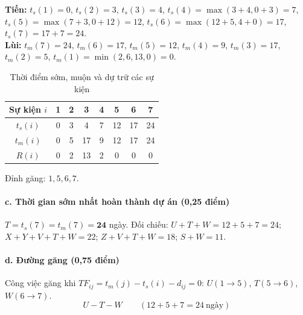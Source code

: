 \documentclass[12pt,a4paper]{article}
\begin{document}
{\small
\textbf{Tiến:}
$t_s(1)=0$,
$t_s(2)=3$,
$t_s(3)=4$,
$t_s(4)=\max(3+4,0+3)=7$,
$t_s(5)=\max(7+3,0+12)=12$,
$t_s(6)=\max(12+5,4+0)=17$,
$t_s(7)=17+7=24$.
\\
\textbf{Lùi:}
$t_m(7)=24$,
$t_m(6)=17$,
$t_m(5)=12$,
$t_m(4)=9$,
$t_m(3)=17$,
$t_m(2)=5$,
$t_m(1)=\min(2,6,13,0)=0$.
}

\begin{table}[H]\centering
\caption{Thời điểm sớm, muộn và dự trữ các sự kiện}
\begin{tabular}{c|ccccccc}
\toprule
Sự kiện $i$ & 1 & 2 & 3 & 4 & 5 & 6 & 7\\
\midrule
$t_s(i)$ & 0 & 3 & 4 & 7 & 12 & 17 & 24\\
$t_m(i)$ & 0 & 5 & 17 & 9 & 12 & 17 & 24\\
$R(i)$   & 0 & 2 & 13 & 2 & 0 & 0 & 0\\
\bottomrule
\end{tabular}
\end{table}

Đỉnh găng: $1,5,6,7$.

\paragraph{c. Thời gian sớm nhất hoàn thành dự án \hfill {\normalfont\small (0,25 điểm)}}
$T=t_s(7)=t_m(7)=\mathbf{24}$ ngày.
Đối chiếu: $U{+}T{+}W=12{+}5{+}7=24$;
$X{+}Y{+}V{+}T{+}W=22$;
$Z{+}V{+}T{+}W=18$;
$S{+}W=11$.

\paragraph{d. Đường găng \hfill {\normalfont\small (0,75 điểm)}}
Công việc găng khi $TF_{ij}=t_m(j)-t_s(i)-d_{ij}=0$: $U(1{\rightarrow}5)$, $T(5{\rightarrow}6)$, $W(6{\rightarrow}7)$.
\[
  \boxed{U-T-W\qquad (12+5+7=24\ \text{ngày})}
\]
\end{document}
